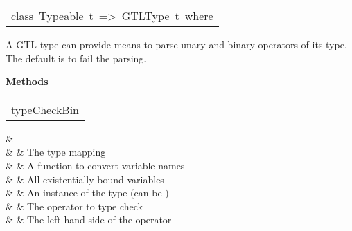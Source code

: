 \begin{haddockdesc}
\item[\begin{tabular}{@{}l}
class\ Typeable\ t\ =>\ GTLType\ t\ where
\end{tabular}]\haddockbegindoc
A GTL type can provide means to parse unary and binary operators of its type.
   The default is to fail the parsing.
\par

\haddockpremethods{}\textbf{Methods}
\begin{haddockdesc}
\item[\begin{tabular}{@{}l}
typeCheckBin
\end{tabular}]\haddockbegindoc
\haddockbeginargs
\haddockdecltt{::} &  \\
                     \haddockdecltt{=>} &  & The type mapping
 \\
                                                                          \haddockdecltt{->} &  & A function to convert variable names
 \\
                                                                                                                                         \haddockdecltt{->} &  & All existentially bound variables
 \\
                                                                                                                                                                                                \haddockdecltt{->} &  & An instance of the type (can be )
 \\
                                                                                                                                                                                                                                         \haddockdecltt{->} &  & The operator to type check
 \\
                                                                                                                                                                                                                                                                                      \haddockdecltt{->} &  & The left hand side of the operator

\end{haddockdesc}
\end{haddockdesc}
